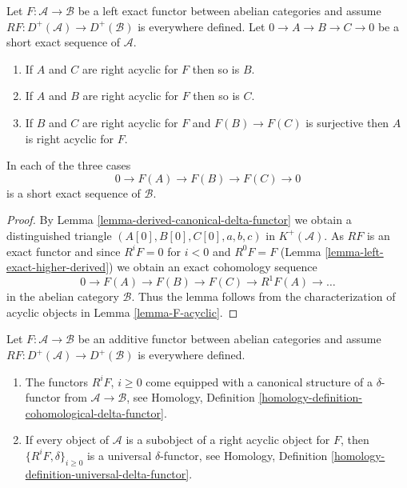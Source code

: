 \begin{lemma}
\label{lemma-F-acyclic-ses}
Let $F : \mathcal{A} \to \mathcal{B}$ be a left exact functor
between abelian categories and assume
$RF : D^{+}(\mathcal{A}) \to D^{+}(\mathcal{B})$ is everywhere
defined. Let $0 \to A \to B \to C \to 0$ be a short exact sequence
of $\mathcal{A}$.
\begin{enumerate}
\item If $A$ and $C$ are right acyclic for $F$ then so is $B$.
\item If $A$ and $B$ are right acyclic for $F$ then so is $C$.
\item If $B$ and $C$ are right acyclic for $F$ and $F(B) \to F(C)$ is
surjective then $A$ is right acyclic for $F$.
\end{enumerate}
In each of the three cases
$$
0 \to F(A) \to F(B) \to F(C) \to 0
$$
is a short exact sequence of $\mathcal{B}$.
\end{lemma}

\begin{proof}
By
Lemma \ref{lemma-derived-canonical-delta-functor}
we obtain a distinguished triangle
$(A[0], B[0], C[0], a, b, c)$ in $K^{+}(\mathcal{A})$.
As $RF$ is an exact functor and since
$R^iF = 0$ for $i < 0$ and $R^0F = F$
(Lemma \ref{lemma-left-exact-higher-derived})
we obtain an exact cohomology sequence
$$
0 \to F(A) \to F(B) \to F(C) \to R^1F(A) \to \ldots
$$
in the abelian category $\mathcal{B}$. Thus the lemma follows from
the characterization of acyclic objects in
Lemma \ref{lemma-F-acyclic}.
\end{proof}

\begin{lemma}
\label{lemma-right-derived-delta-functor}
Let $F : \mathcal{A} \to \mathcal{B}$ be an additive functor
between abelian categories and assume
$RF : D^{+}(\mathcal{A}) \to D^{+}(\mathcal{B})$ is everywhere defined.
\begin{enumerate}
\item The functors $R^iF$, $i \geq 0$ come equipped with a canonical
structure of a $\delta$-functor from $\mathcal{A} \to \mathcal{B}$, see
Homology, Definition \ref{homology-definition-cohomological-delta-functor}.
\item If every object of $\mathcal{A}$ is a subobject of a right
acyclic object for $F$, then $\{R^iF, \delta\}_{i \geq 0}$ is a
universal $\delta$-functor, see
Homology, Definition \ref{homology-definition-universal-delta-functor}.
\end{enumerate}
\end{lemma}

